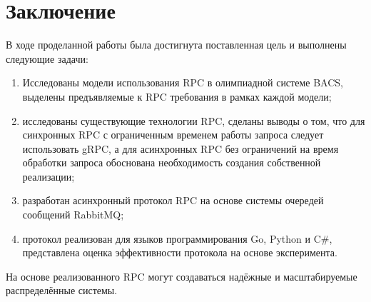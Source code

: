 \chapter{Заключение}
В ходе проделанной работы была достигнута поставленная цель и выполнены
следующие задачи:
\begin{enumerate}
    \item Исследованы модели использования RPC в олимпиадной системе BACS,
        выделены предъявляемые к RPC требования в рамках каждой модели;
    \item исследованы существующие технологии RPC, сделаны выводы о том,
        что для синхронных RPC с ограниченным временем работы запроса
        следует использовать gRPC, а для асинхронных RPC без ограничений
        на время обработки запроса обоснована необходимость создания
        собственной реализации;
    \item разработан асинхронный протокол RPC на основе системы очередей
        сообщений RabbitMQ;
    \item протокол реализован для языков программирования Go, Python и C\#,
        представлена оценка эффективности протокола на основе эксперимента.
\end{enumerate}
На основе реализованного RPC могут создаваться надёжные и масштабируемые
распределённые системы.

